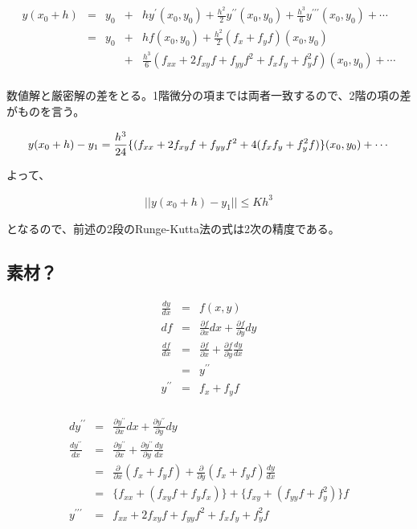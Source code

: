 \[
\begin{array}{lclcl}
y(x_0 + h) & = & y_0 & + & hy^{\prime}(x_0 , y_0) + \frac{h^2}{2}y^{\prime \prime}(x_0 , y_0) + \frac{h^3}{6}y^{\prime \prime \prime}(x_0 , y_0) + \cdots\\
    & = & y_0 & + & hf(x_0 , y_0) + \frac{h^2}{2}(f_x + f_yf)(x_0 , y_0) \\
    &   &     & + & \frac{h^3}{6}(f_{xx} + 2f_{xy}f + f_{yy}f^2 + f_{x}f_{y} + f_{y}^2 f)(x_0 , y_0) + \cdots\\
\end{array}
\]

数値解と厳密解の差をとる。1階微分の項までは両者一致するので、2階の項の差がものを言う。

\[
y(x_0+h) - y_1 = \frac{h^3}{24}\{(f_{xx} + 2f_{xy}f + f_{yy}f^2 + 4 ( f_{x}f_{y} + f_{y}^2 f )\}(x_0 , y_0) + \cdots\\
\]

よって、

\[
|| y(x_0+h) - y_1 || \leq Kh^3
\]

となるので、前述の2段のRunge-Kutta法の式は2次の精度である。

\subsection{素材？}
\begin{eqnarray*}
\frac{dy}{dx} & = & f(x,y) \\
df & = & \frac{\partial f}{\partial x} dx + \frac{\partial f}{\partial y} dy\\
\frac{df}{dx} & = & \frac{\partial f}{\partial x} + \frac{\partial f}{\partial y}\frac{dy}{dx}\\
              & = & y^{\prime \prime}\\
y^{\prime \prime} & = & f_x + f_yf\\
\end{eqnarray*}

\begin{eqnarray*}
dy^{\prime \prime} & = & \frac{\partial y^{\prime \prime}}{\partial x} dx + \frac{\partial y^{\prime \prime}}{\partial y}dy\\
\frac{dy^{\prime \prime}}{dx} & = & \frac{\partial y^{\prime \prime}}{\partial x} + \frac{\partial y^{\prime \prime}}{\partial y}\frac{dy}{dx}\\
 & = & \frac{\partial}{\partial x}(f_x + f_yf) + \frac{\partial }{\partial y}(f_x + f_yf)\frac{dy}{dx}\\
 & = & \{f_{xx} + (f_{xy}f + f_{y}f_{x})\} + \{f_{xy} + (f_{yy}f + f_{y}^2)\}f\\
y^{\prime \prime \prime} & = & f_{xx} + 2f_{xy}f + f_{yy}f^2 + f_{x}f_{y} + f_{y}^2 f\\
\end{eqnarray*}


